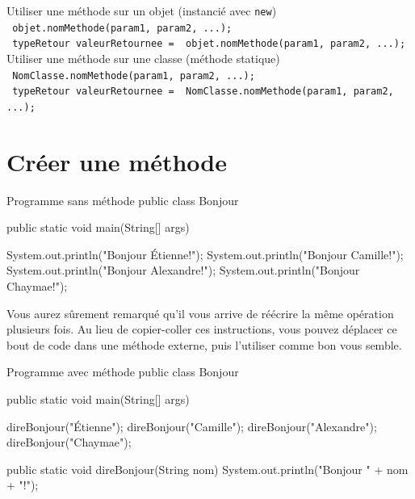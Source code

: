 \documentclass[12pt]{report}
\begin{document}
%
\begin{tcolorbox}[enhanced,colframe=ultRed,
	title={Utiliser une méthode},
	sharp corners=south,
	boxsep = 1.5mm]
%
Utiliser une méthode sur un objet (instancié avec \texttt{new}) \\[3pt]
\texttt{{\color{ec-green} objet}.{\color[RGB]{255, 34, 12}nomMethode}({\color[RGB]{63, 136, 197}param1}, {\color[RGB]{63, 136, 197}param2}, ...);}\\
\texttt{{\color{ultRed} typeRetour} {\color[RGB]{63, 136, 197}valeurRetournee} = {\color{ec-green} objet}.{\color[RGB]{255, 34, 12}nomMethode}({\color[RGB]{63, 136, 197}param1}, {\color[RGB]{63, 136, 197}param2}, ...);}%
%
\tcblower
%
Utiliser une méthode sur une classe (méthode statique) \\[3pt]
\texttt{{\color{ec-purple} NomClasse}.{\color[RGB]{255, 34, 12}nomMethode}({\color[RGB]{63, 136, 197}param1}, {\color[RGB]{63, 136, 197}param2}, ...);}\\
\texttt{{\color{ultRed} typeRetour} {\color[RGB]{63, 136, 197}valeurRetournee} = {\color{ec-purple} NomClasse}.{\color[RGB]{255, 34, 12}nomMethode}({\color[RGB]{63, 136, 197}param1}, {\color[RGB]{63, 136, 197}param2}, ...);}%
%	
\end{tcolorbox}


\section{Créer une méthode}

\begin{MyTCB}{Programme sans méthode}
public class Bonjour {

    public static void main(String[] args) {

        System.out.println("Bonjour Étienne!");
        System.out.println("Bonjour Camille!");
        System.out.println("Bonjour Alexandre!");
        System.out.println("Bonjour Chaymae!");

    }

}
\end{MyTCB}

Vous aurez sûrement remarqué qu'il vous arrive de réécrire la même opération plusieurs fois. Au lieu de copier-coller ces instructions, vous pouvez déplacer ce bout de code dans une méthode externe, puis l'utiliser comme bon vous semble.

\begin{MyTCB}{Programme avec méthode}
public class Bonjour {

    public static void main(String[] args) {

        direBonjour("Étienne");
        direBonjour("Camille");
        direBonjour("Alexandre");
        direBonjour("Chaymae");
        
    }

    public static void direBonjour(String nom) {
        System.out.println("Bonjour " + nom + "!");
    }

}
\end{MyTCB}
\end{document}
